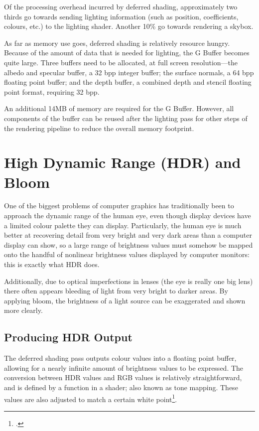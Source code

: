 \documentclass[11pt, oneside]{report}
\begin{document}
Of the processing overhead incurred by deferred shading, approximately two thirds go towards sending lighting information (such as position, coefficients, colours, etc.) to the lighting shader. Another 10\% go towards rendering a skybox.

As far as memory use goes, deferred shading is relatively resource hungry. Because of the amount of data that is needed for lighting, the \gls{G Buffer} becomes quite large. Three buffers need to be allocated, at full screen resolution---the albedo and specular buffer, a 32 \gls{bpp} integer buffer; the surface normals, a 64 \gls{bpp} floating point buffer; and the depth buffer, a combined depth and stencil floating point format, requiring 32 \gls{bpp}.

An additional 14MB of memory are required for the \gls{G Buffer}. However, all components of the buffer can be reused after the lighting pass for other steps of the rendering pipeline to reduce the overall memory footprint.

\chapter{High Dynamic Range (HDR) and Bloom}
One of the biggest problems of computer graphics has traditionally been to approach the dynamic range of the human eye, even though display devices have a limited colour palette they can display. Particularly, the human eye is much better at recovering detail from very bright and very dark areas than a computer display can show, so a large range of brightness values must somehow be mapped onto the handful of nonlinear brightness values displayed by computer monitors: this is exactly what \gls{HDR} does.

Additionally, due to optical imperfections in lenses (the eye is really one big lens) there often appears bleeding of light from very bright to darker areas. By applying \gls{bloom}, the brightness of a light source can be exaggerated and shown more clearly.

\section{Producing HDR Output}
The deferred shading pass outputs colour values into a \gls{floating point} buffer, allowing for a nearly infinite amount of brightness values to be expressed. The conversion between HDR values and \gls{RGB} values is relatively straightforward, and is defined by a function in a \gls{shader}; also known as \gls{tone mapping}. These values are also adjusted to match a certain \gls{white point}\footcite{hdr}.
\end{document}
